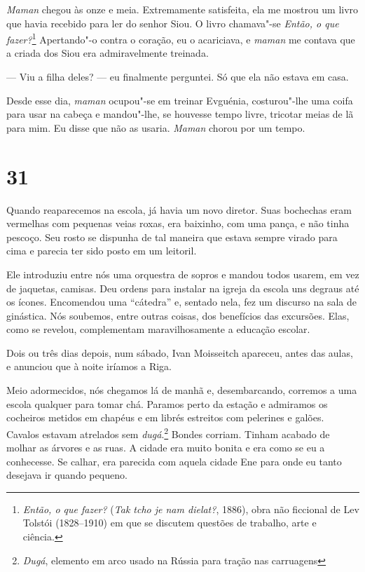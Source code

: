 \emph{Maman} chegou às onze e meia. Extremamente satisfeita, ela me
mostrou um livro que havia recebido para ler do senhor Siou. O livro
chamava"-se \emph{Então, o que fazer?}\footnote{\emph{Então, o que
  fazer?} (\emph{Tak tcho je nam dielat?}, 1886), obra não
  ficcional de Lev Tolstói (1828--1910) em que se discutem questões de
  trabalho, arte e ciência.} Apertando"-o contra o coração, eu o
acariciava, e \emph{maman} me contava que a criada dos Siou era
admiravelmente treinada.

--- Viu a filha deles? --- eu finalmente perguntei. Só que ela não
estava em casa.

Desde esse dia, \emph{maman} ocupou"-se em treinar Evguénia, costurou"-lhe
uma coifa para usar na cabeça e mandou"-lhe, se houvesse tempo livre,
tricotar meias de lã para mim. Eu disse que não as usaria. \emph{Maman}
chorou por um tempo.

\section{31}

Quando reaparecemos na escola, já havia um novo diretor. Suas bochechas
eram vermelhas com pequenas veias roxas, era baixinho, com uma pança, e
não tinha pescoço. Seu rosto se dispunha de tal maneira que estava
sempre virado para cima e parecia ter sido posto em um leitoril.

Ele introduziu entre nós uma orquestra de sopros e mandou todos usarem,
em vez de jaquetas, camisas. Deu ordens para instalar na igreja da
escola uns degraus até os ícones. Encomendou uma ``cátedra'' e, sentado
nela, fez um discurso na sala de ginástica. Nós soubemos, entre outras
coisas, dos benefícios das excursões. Elas, como se revelou,
complementam maravilhosamente a educação escolar.

Dois ou três dias depois, num sábado, Ivan Moisseitch apareceu, antes
das aulas, e anunciou que à noite iríamos a Riga.

Meio adormecidos, nós chegamos lá de manhã e, desembarcando, corremos a
uma escola qualquer para tomar chá. Paramos perto da estação e admiramos
os cocheiros metidos em chapéus e em librés estreitos com pelerines e
galões. Cavalos estavam atrelados sem \emph{dugá}.\footnote{\emph{Dugá},
  elemento em arco usado na Rússia para tração nas carruagens} Bondes
corriam. Tinham acabado de molhar as árvores e as ruas. A cidade era
muito bonita e era como se eu a conhecesse. Se calhar, era parecida com
aquela cidade Ene para onde eu tanto desejava ir quando pequeno.

